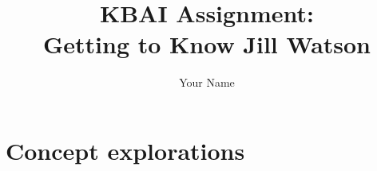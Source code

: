 \documentclass[
	letterpaper, %
]{jdf}
\author{Your Name}
\title{KBAI Assignment:\\Getting to Know Jill Watson}
\begin{document}
\maketitle




\section{Concept explorations}

%
%
%
%
\end{document}
